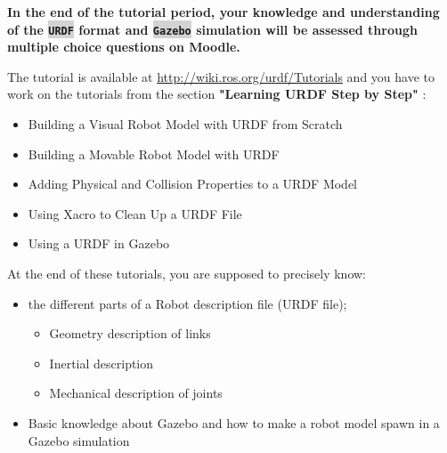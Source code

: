 \documentclass[10pt,a4paper]{upmc}
\newcommand{\mytext}[1]{\colorbox{lightgray}{\texttt{#1}}}
\begin{document}
\textbf{In the end of the tutorial period, your knowledge and understanding of the \mytext{URDF}
  format and \mytext{Gazebo} simulation will be assessed through multiple choice questions on
  Moodle.}

\begin{mdframed}[style=graybox]
  The tutorial is available at \url{http://wiki.ros.org/urdf/Tutorials} and you have to work on
  the tutorials from the section \textbf{"Learning URDF Step by Step"} :
  \begin{itemize}
    \item Building a Visual Robot Model with URDF from Scratch
    \item Building a Movable Robot Model with URDF
    \item Adding Physical and Collision Properties to a URDF Model
    \item Using Xacro to Clean Up a URDF File
    \item Using a URDF in Gazebo
  \end{itemize}
  \noindent At the end of these tutorials, you are supposed to precisely know:
  \begin{itemize}
    \itemsep=-1pt
    \item the different parts of a Robot description file (URDF file);
          \begin{itemize}
            \item  Geometry description of links
            \item Inertial description
            \item Mechanical description of joints
          \end{itemize}
    \item Basic knowledge about Gazebo and how to make a robot model spawn in a Gazebo simulation

  \end{itemize}
\end{mdframed}
\newpage
\end{document}
